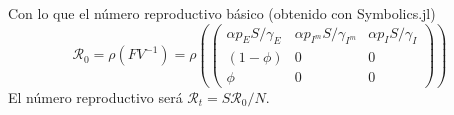 Con lo que el número reproductivo básico (obtenido con Symbolics.jl)
\[
\mathcal{R}_{0} = \rho(FV^{-1}) = \rho \left(
\begin{pmatrix}
\alpha p_E S/\gamma_E & \alpha p_{I^m} S/ \gamma_{I^m}& \alpha p_I S/\gamma_I \\
(1-\phi) & 0 & 0 \\
\phi & 0 & 0
\end{pmatrix}
\right)
\]
El número reproductivo será \(\mathcal{R}_t = S\mathcal{R}_0 /N\).














